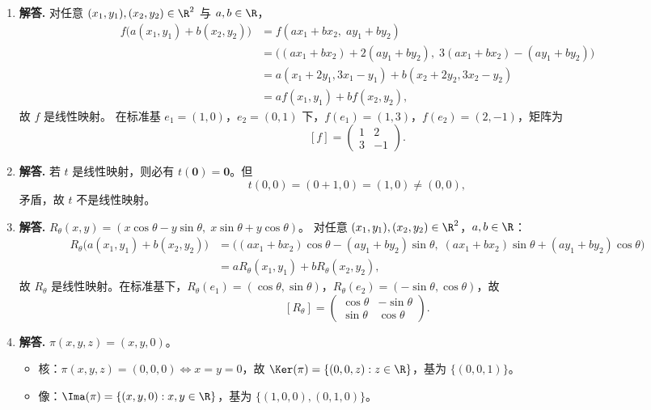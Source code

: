 \begin{enumerate}[label=\textbf{\arabic*.}, leftmargin=*, itemsep=1em]


\item \textbf{解答.}
对任意 $(x_1,y_1),(x_2,y_2)\in\R^2$ 与 $a,b\in\R$，
\begin{align*}
  f\bigl(a(x_1,y_1)+b(x_2,y_2)\bigr)
  &= f(ax_1+bx_2,\;ay_1+by_2) \\
  &= \bigl((ax_1+bx_2)+2(ay_1+by_2),\;3(ax_1+bx_2)-(ay_1+by_2)\bigr) \\
  &= a(x_1+2y_1,3x_1-y_1)+b(x_2+2y_2,3x_2-y_2) \\
  &= af(x_1,y_1)+bf(x_2,y_2),
\end{align*}
故 $f$ 是线性映射。
在标准基 $e_1=(1,0)$，$e_2=(0,1)$ 下，$f(e_1)=(1,3)$，$f(e_2)=(2,-1)$，矩阵为
\[
  [f] = \begin{pmatrix}1 & 2\\ 3 & -1\end{pmatrix}.
\]

\item \textbf{解答.}
若 $t$ 是线性映射，则必有 $t(\mathbf 0)=\mathbf 0$。但
\[
  t(0,0)=(0+1,0)=(1,0)\neq(0,0),
\]
矛盾，故 $t$ 不是线性映射。

\item \textbf{解答.}
$R_\theta(x,y)=(x\cos\theta-y\sin\theta,\;x\sin\theta+y\cos\theta)$。
对任意 $(x_1,y_1),(x_2,y_2)\in\R^2$，$a,b\in\R$：
\begin{align*}
  R_\theta\bigl(a(x_1,y_1)+b(x_2,y_2)\bigr)
  &= \bigl((ax_1+bx_2)\cos\theta-(ay_1+by_2)\sin\theta,\;(ax_1+bx_2)\sin\theta+(ay_1+by_2)\cos\theta\bigr) \\
  &= aR_\theta(x_1,y_1)+bR_\theta(x_2,y_2),
\end{align*}
故 $R_\theta$ 是线性映射。在标准基下，$R_\theta(e_1)=(\cos\theta,\sin\theta)$，$R_\theta(e_2)=(-\sin\theta,\cos\theta)$，故
\[
  [R_\theta]=\begin{pmatrix}\cos\theta & -\sin\theta\\ \sin\theta & \cos\theta\end{pmatrix}.
\]

\item \textbf{解答.}
$\pi(x,y,z)=(x,y,0)$。
\begin{itemize}
  \item 核：$\pi(x,y,z)=(0,0,0)\Leftrightarrow x=y=0$，故 $\Ker(\pi)=\{(0,0,z):z\in\R\}$，基为 $\{(0,0,1)\}$。
  \item 像：$\Ima(\pi)=\{(x,y,0):x,y\in\R\}$，基为 $\{(1,0,0),(0,1,0)\}$。
\end{itemize}


\end{enumerate}
